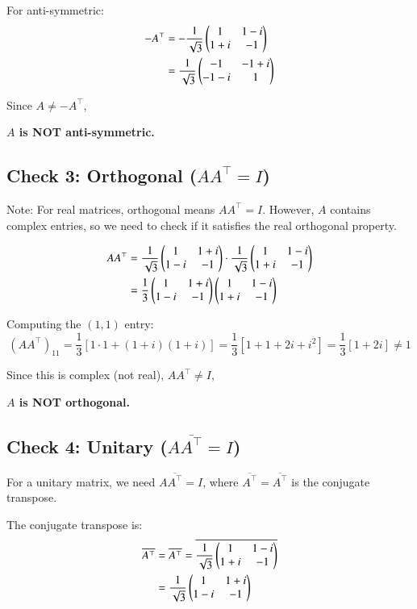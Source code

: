 \documentclass[journal]{IEEEtran}
\begin{document}
For anti-symmetric:
\begin{align}
	-A^\top &= -\frac{1}{\sqrt{3}}\begin{pmatrix}1 & 1-i \\ 1+i & -1\end{pmatrix}\\
	&= \frac{1}{\sqrt{3}}\begin{pmatrix}-1 & -1+i \\ -1-i & 1\end{pmatrix}
\end{align}

Since $A \neq -A^\top$,

\textbf{$A$ is NOT anti-symmetric.}

\subsection*{Check 3: Orthogonal ($AA^\top = I$)}

Note: For real matrices, orthogonal means $AA^\top = I$. However, $A$ contains complex entries, so we need to check if it satisfies the real orthogonal property.

\begin{align}
	AA^\top &= \frac{1}{\sqrt{3}}\begin{pmatrix}1 & 1+i \\ 1-i & -1\end{pmatrix} \cdot \frac{1}{\sqrt{3}}\begin{pmatrix}1 & 1-i \\ 1+i & -1\end{pmatrix}\\
	&= \frac{1}{3}\begin{pmatrix}1 & 1+i \\ 1-i & -1\end{pmatrix}\begin{pmatrix}1 & 1-i \\ 1+i & -1\end{pmatrix}
\end{align}

Computing the $(1,1)$ entry:
\begin{equation}
	(AA^\top)_{11} = \frac{1}{3}\left[1 \cdot 1 + (1+i)(1+i)\right] = \frac{1}{3}\left[1 + 1 + 2i + i^2\right] = \frac{1}{3}[1 + 2i] \neq 1
\end{equation}

Since this is complex (not real), $AA^\top \neq I$,

\textbf{$A$ is NOT orthogonal.}

\subsection*{Check 4: Unitary ($A\overline{A^\top} = I$)}

For a unitary matrix, we need $A\overline{A^\top} = I$, where $\overline{A^\top} = \overline{A^\top}$ is the conjugate transpose.

The conjugate transpose is:
\begin{align}
	\overline{A^\top} &= \overline{A^\top} = \overline{\frac{1}{\sqrt{3}}\begin{pmatrix}1 & 1-i \\ 1+i & -1\end{pmatrix}}\\
	&= \frac{1}{\sqrt{3}}\begin{pmatrix}1 & 1+i \\ 1-i & -1\end{pmatrix}
\end{align}
\end{document}
